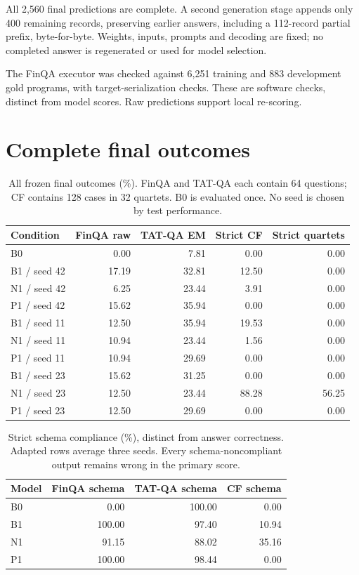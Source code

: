 \documentclass[11pt,a4paper]{article}
\begin{document}
All 2,560 final predictions are complete. A second generation stage appends only 400 remaining records, preserving earlier answers, including a 112-record partial prefix, byte-for-byte. Weights, inputs, prompts and decoding are fixed; no completed answer is regenerated or used for model selection.

The FinQA executor was checked against 6,251 training and 883 development gold programs, with target-serialization checks. These are software checks, distinct from model scores. Raw predictions support local re-scoring.


\clearpage
\appendix
\small
\section{Complete final outcomes}
\begin{table}[htbp]\centering\small\begin{tabular}{lrrrr}\toprule
Condition & FinQA raw & TAT-QA EM & Strict CF & Strict quartets \\ \midrule
B0 & 0.00 & 7.81 & 0.00 & 0.00 \\
B1 / seed 42 & 17.19 & 32.81 & 12.50 & 0.00 \\
N1 / seed 42 & 6.25 & 23.44 & 3.91 & 0.00 \\
P1 / seed 42 & 15.62 & 35.94 & 0.00 & 0.00 \\
B1 / seed 11 & 12.50 & 35.94 & 19.53 & 0.00 \\
N1 / seed 11 & 10.94 & 23.44 & 1.56 & 0.00 \\
P1 / seed 11 & 10.94 & 29.69 & 0.00 & 0.00 \\
B1 / seed 23 & 15.62 & 31.25 & 0.00 & 0.00 \\
N1 / seed 23 & 12.50 & 23.44 & 88.28 & 56.25 \\
P1 / seed 23 & 12.50 & 29.69 & 0.00 & 0.00 \\
\bottomrule\end{tabular}\caption{All frozen final outcomes (\%). FinQA and TAT-QA each contain 64 questions; CF contains 128 cases in 32 quartets. B0 is evaluated once. No seed is chosen by test performance.}\label{tab:all-seeds}\end{table}
\begin{table}[htbp]\centering\small\begin{tabular}{lrrr}\toprule
Model & FinQA schema & TAT-QA schema & CF schema \\ \midrule
B0 & 0.00 & 100.00 & 0.00 \\
B1 & 100.00 & 97.40 & 10.94 \\
N1 & 91.15 & 88.02 & 35.16 \\
P1 & 100.00 & 98.44 & 0.00 \\
\bottomrule\end{tabular}\caption{Strict schema compliance (\%), distinct from answer correctness. Adapted rows average three seeds. Every schema-noncompliant output remains wrong in the primary score.}\label{tab:parse}\end{table}
\end{document}

